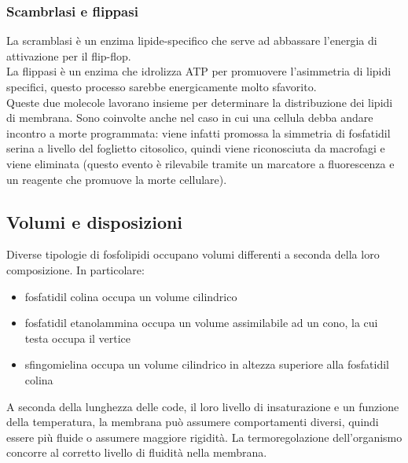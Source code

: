         \subsubsection{Scambrlasi e flippasi}
            La scramblasi è un enzima lipide-specifico che serve ad abbassare l'energia di attivazione per il flip-flop. \\
            La flippasi è un enzima che idrolizza ATP per promuovere l'asimmetria di lipidi specifici, questo processo sarebbe energicamente molto sfavorito. \\
            Queste due molecole lavorano insieme per determinare la distribuzione dei lipidi di membrana. 
            Sono coinvolte anche nel caso in cui una cellula debba andare incontro a morte programmata: viene infatti promossa la simmetria di fosfatidil serina a livello del foglietto citosolico, quindi viene riconosciuta da macrofagi e viene eliminata (questo evento è rilevabile tramite un marcatore a fluorescenza e un reagente che promuove la morte cellulare).
        
    \subsection{Volumi e disposizioni}
        Diverse tipologie di fosfolipidi occupano volumi differenti a seconda della loro composizione. In particolare:
        \begin{itemize}
            \item fosfatidil colina occupa un volume cilindrico
            \item fosfatidil etanolammina occupa un volume assimilabile ad un cono, la cui testa occupa il vertice
            \item sfingomielina occupa un volume cilindrico in altezza superiore alla fosfatidil colina
        \end{itemize}
        A seconda della lunghezza delle code, il loro livello di insaturazione e un funzione della temperatura, la membrana può assumere comportamenti diversi, quindi essere più fluide o assumere maggiore rigidità. La termoregolazione dell'organismo concorre al corretto livello di fluidità nella membrana.
        
